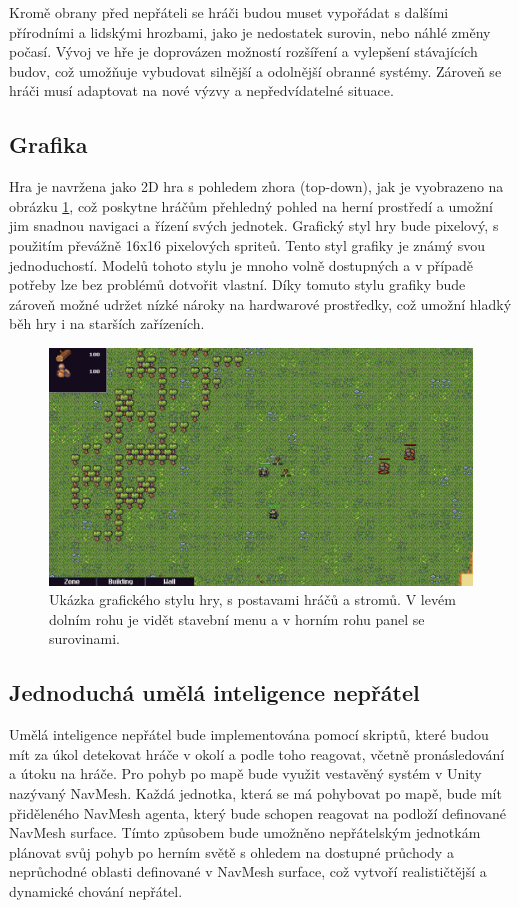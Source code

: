 Kromě obrany před nepřáteli se hráči budou muset vypořádat s dalšími přírodními a lidskými hrozbami, jako je nedostatek surovin, nebo náhlé změny počasí. Vývoj ve hře je doprovázen možností rozšíření a vylepšení stávajících budov, což umožňuje vybudovat silnější a odolnější obranné systémy. Zároveň se hráči musí adaptovat na nové výzvy a nepředvídatelné situace.
\newpage 

\subsection{Grafika}
Hra je navržena jako 2D hra s pohledem zhora (top-down), jak je vyobrazeno na obrázku \ref{GraphicStyle}, což poskytne hráčům přehledný pohled na herní prostředí a umožní jim snadnou navigaci a řízení svých jednotek. Grafický styl hry bude pixelový, s použitím převážně 16x16 pixelových spriteů. Tento styl grafiky je známý svou jednoduchostí. Modelů tohoto stylu je mnoho volně dostupných a v případě potřeby lze bez problémů dotvořit vlastní. Díky tomuto stylu grafiky bude zároveň možné udržet nízké nároky na hardwarové prostředky, což umožní hladký běh hry i na starších zařízeních.

\begin{figure}[H]
	\centering
	\includegraphics[scale=0.55]{obrazky-figures/GraphicStyle.png}
	\caption{Ukázka grafického stylu hry, s postavami hráčů a stromů. V levém dolním rohu je vidět stavební menu a v horním rohu panel se surovinami.}
	\label{GraphicStyle}
\end{figure}

\subsection{Jednoduchá umělá inteligence nepřátel}
Umělá inteligence nepřátel bude implementována pomocí skriptů, které budou mít za úkol detekovat hráče v okolí a podle toho reagovat, včetně pronásledování a útoku na hráče. Pro pohyb po mapě bude využit vestavěný systém v Unity nazývaný NavMesh. Každá jednotka, která se má pohybovat po mapě, bude mít přiděleného NavMesh agenta, který bude schopen reagovat na podloží definované NavMesh surface. Tímto způsobem bude umožněno nepřátelským jednotkám plánovat svůj pohyb po herním světě s ohledem na dostupné průchody a neprůchodné oblasti definované v NavMesh surface, což vytvoří realističtější a dynamické chování nepřátel.

